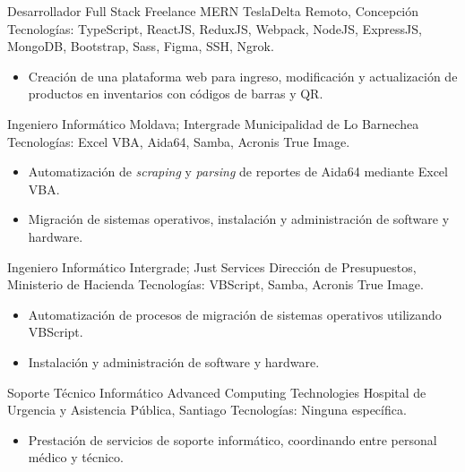 \documentclass[12pt,letterpaper,sans]{moderncv}
\begin{document}
{Desarrollador Full Stack Freelance MERN}
{TeslaDelta}
{\newline Remoto, Concepción}
{\newline Tecnologías: TypeScript, ReactJS, ReduxJS, Webpack, NodeJS, ExpressJS, MongoDB, Bootstrap, Sass, Figma, SSH, Ngrok.}
{
  \begin{itemize}
    \item Creación de una plataforma web para ingreso, modificación y actualización de productos en inventarios con códigos de barras y QR.
  \end{itemize}
}
\vspace{0.5em}

{Ingeniero Informático}
{Moldava; Intergrade}
{\newline Municipalidad de Lo Barnechea}
{\newline Tecnologías: Excel VBA, Aida64, Samba, Acronis True Image.}
{
  \begin{itemize}
    \item Automatización de \textit{scraping} y \textit{parsing} de reportes de Aida64 mediante Excel VBA.
    \item Migración de sistemas operativos, instalación y administración de software y hardware.
  \end{itemize}
}
\vspace{0.5em}

{Ingeniero Informático}
{Intergrade; Just Services}
{\newline Dirección de Presupuestos, Ministerio de Hacienda}
{\newline Tecnologías: VBScript, Samba, Acronis True Image.}
{
  \begin{itemize}
    \item Automatización de procesos de migración de sistemas operativos utilizando VBScript.
    \item Instalación y administración de software y hardware.
  \end{itemize}
}
\vspace{0.5em}

{Soporte Técnico Informático}
{Advanced Computing Technologies}
{\newline Hospital de Urgencia y Asistencia Pública, Santiago}
{\newline Tecnologías: Ninguna específica.}
{
  \begin{itemize}
    \item Prestación de servicios de soporte informático, coordinando entre personal médico y técnico.
  \end{itemize}
}
\vspace{0.5em}
\end{document}
